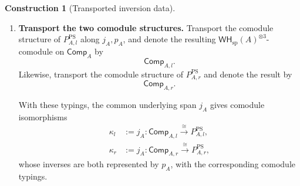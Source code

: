 \documentclass[oneside]{article}
\newcommand{\WH}{\mathsf{WH}}
\newcommand{\Sp}{\mathbf{Sp}}
\newcommand{\Kar}{\operatorname{Kar}}
\theoremstyle{plain}
\theoremstyle{definition}
\newtheorem{construction}[theorem]{Construction}
\theoremstyle{remark}
\begin{document}
\begin{construction}[Transported inversion data]
\begin{enumerate}
        By Proposition~\ref{prop:cgqg-ps-karoubi-transport}, their common underlying Karoubi object is
        \[
            \bigl(
                \WH_{\mathrm{sp}}(A)\times\WH_{\mathrm{sp}}(A),
                a_A
            \bigr),
            \qquad
            a_A=j_Ap_A,
        \]
        with split image \(J(\mathsf{Comp}_A)\). The splitting maps
        \[
            j_A:
            J(\mathsf{Comp}_A)
            \longrightarrow
            \bigl(
                \WH_{\mathrm{sp}}(A)\times\WH_{\mathrm{sp}}(A),
                a_A
            \bigr),
        \]
        and
        \[
            p_A:
            \bigl(
                \WH_{\mathrm{sp}}(A)\times\WH_{\mathrm{sp}}(A),
                a_A
            \bigr)
            \longrightarrow
            J(\mathsf{Comp}_A)
        \]
        satisfy
        \[
            p_Aj_A
            =
            1_{\mathsf{Comp}_A},
            \qquad
            j_Ap_A
            =
            a_A.
        \]
        Hence \(j_A\) and \(p_A\) are mutually inverse morphisms in
        \(\Kar(\Sp)\).

        \item \textbf{Transport the two comodule structures.} Transport the comodule structure of \(P_{A,l}^{\mathrm{PS}}\) along \(j_A,p_A\), and denote the resulting \(\WH_{\mathrm{sp}}(A)^{\otimes3}\)-comodule on \(\mathsf{Comp}_A\) by
        \[
            \mathsf{Comp}_{A,l}.
        \]
        Likewise, transport the comodule structure of \(P_{A,r}^{\mathrm{PS}}\) and denote the result by
        \[
            \mathsf{Comp}_{A,r}.
        \]

        With these typings, the common underlying span \(j_A\) gives comodule isomorphisms
        \begin{align}
            \kappa_l
            &:=
            j_A:
            \mathsf{Comp}_{A,l}
            \xrightarrow{\cong}
            P_{A,l}^{\mathrm{PS}},
            \label{eq:cgqg-kappa-left-explicit}\\
            \kappa_r
            &:=
            j_A:
            \mathsf{Comp}_{A,r}
            \xrightarrow{\cong}
            P_{A,r}^{\mathrm{PS}},
            \label{eq:cgqg-kappa-right-explicit}
        \end{align}
        whose inverses are both represented by \(p_A\), with the corresponding comodule typings.


\end{enumerate}
\end{construction}
\end{document}
